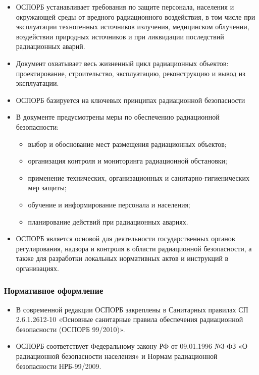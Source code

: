 \documentclass[a4paper, 14pt]{extarticle}
\begin{document}
\begin{itemize}
    \item ОСПОРБ устанавливает требования по защите персонала, населения и окружающей среды от вредного радиационного воздействия, в том числе при эксплуатации техногенных источников излучения, медицинском облучении, воздействии природных источников и при ликвидации последствий радиационных аварий.

    \item Документ охватывает весь жизненный цикл радиационных объектов: проектирование, строительство, эксплуатацию, реконструкцию и вывод из эксплуатации.

    \item ОСПОРБ базируется на ключевых принципах радиационной безопасности

    \item В документе предусмотрены меры по обеспечению радиационной безопасности:
          \begin{itemize}
              \item выбор и обоснование мест размещения радиационных объектов;
              \item организация контроля и мониторинга радиационной обстановки;
              \item применение технических, организационных и санитарно-гигиенических мер защиты;
              \item обучение и информирование персонала и населения;
              \item планирование действий при радиационных авариях.
          \end{itemize}

    \item ОСПОРБ является основой для деятельности государственных органов регулирования, надзора и контроля в области радиационной безопасности, а также для разработки локальных нормативных актов и инструкций в организациях.
\end{itemize}

\subsubsection*{Нормативное оформление}

\begin{itemize}
    \item В современной редакции ОСПОРБ закреплены в Санитарных правилах СП 2.6.1.2612-10 «Основные санитарные правила обеспечения радиационной безопасности (ОСПОРБ 99/2010)».

    \item ОСПОРБ соответствует Федеральному закону РФ от 09.01.1996 №3-ФЗ «О радиационной безопасности населения» и Нормам радиационной безопасности НРБ-99/2009.
\end{itemize}
\end{document}
